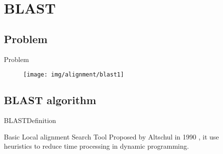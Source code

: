 \documentclass[10pt]{beamer}
\newcommand{\1}{
	\setbeamertemplate{background}{
		\texttt{[image: img/1]}
		\tikz[overlay] \fill[fill opacity=0.75,fill=white] (0,0) rectangle (-\paperwidth,\paperheight);
	}
}
\begin{document}
\section{BLAST}

\subsection{Problem}

\begin{frame}{Problem}
	\begin{figure}[]
		\centering
		\texttt{[image: img/alignment/blast1]}
		\label{img:uniprot}
	\end{figure}
\end{frame}

\subsection{BLAST algorithm}

\begin{frame}{BLAST}{Definition}
	\begin{block}{Basic Local alignment Search Tool}
		Proposed by Altschul in 1990 \cite{altschul1990basic}, it use heuristics to reduce time processing in dynamic programming.
	\end{block}
\end{frame}
\end{document}
